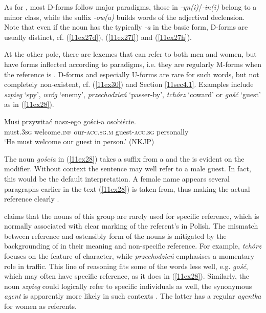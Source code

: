 \documentclass[output=paper,colorlinks,citecolor=brown]{langscibook}
\begin{document}
As for , most D-forms follow major  paradigms, those in \emph{\nobreakdash-yn(i)}/\emph{-in(i)} belong to a minor class, while the suffix \emph{-ow(a)} builds words of the adjectival declension. Note that even if the  noun has the typically  \emph{-a} in the basic form, D-forms are usually distinct, cf. (\ref{11ex27d}), (\ref{11ex27f}) and (\ref{11ex27h}).

At the other pole, there are lexemes that can refer to both men and women, but have forms inflected according to  paradigms, i.e. they are regularly M-forms when the reference is . D-forms and especially U-forms are rare for such words, but not completely non-existent, cf. (\ref{11ex30}) and Section \ref{11sec4.1}. Examples include \emph{szpieg} `spy', \emph{wróg} `enemy', \emph{przechodzień} `passer-by', \emph{tchórz} `coward' or \emph{gość} `guest' as in (\ref{11ex28}).

\begin{exe}
	\ex \label{11ex28}
	\gll Musi przywitać nasz-ego gości-a osobiście. \\
	must.\textsc{3sg} welcome.\textsc{inf} our-\textsc{acc.sg.m} guest-\textsc{acc.sg} personally \\
	\trans ‘He must welcome our guest in person.’ \hfill (NKJP)
\end{exe}

The noun \emph{gościa} in (\ref{11ex28}) takes a suffix from a   and the   is evident on the modifier. Without context the sentence may well refer to a male guest. In fact, this would be the default interpretation. A female name appears several paragraphs earlier in the text (\ref{11ex28}) is taken from, thus making the actual reference clearly .

\citet[267]{lazinski2006} claims that the nouns of this group are rarely used for specific reference, which is normally associated with clear marking of the referent's  in Polish. The mismatch between  reference and ostensibly  form of the nouns is mitigated by the backgrounding of  in their meaning and non-specific reference. For example, \emph{tchórz} focuses on the feature of character, while \emph{przechodzień} emphasises a momentary role in traffic. This line of reasoning fits some of the words less well, e.g. \emph{gość}, which may often have specific reference, as it does in (\ref{11ex28}). Similarly, the noun \emph{szpieg} could logically refer to specific individuals as well, the synonymous \emph{agent} is apparently more likely in such contexts \citep[268]{lazinski2006}. The latter has a regular  \emph{agentka} for women as referents.
\end{document}
